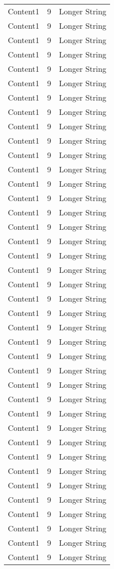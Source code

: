 \documentclass{article}%
\begin{document}
\begin{longtable}{l l l}
Content1&9&Longer String\\%
Content1&9&Longer String\\%
Content1&9&Longer String\\%
Content1&9&Longer String\\%
Content1&9&Longer String\\%
Content1&9&Longer String\\%
Content1&9&Longer String\\%
Content1&9&Longer String\\%
Content1&9&Longer String\\%
Content1&9&Longer String\\%
Content1&9&Longer String\\%
Content1&9&Longer String\\%
Content1&9&Longer String\\%
Content1&9&Longer String\\%
Content1&9&Longer String\\%
Content1&9&Longer String\\%
Content1&9&Longer String\\%
Content1&9&Longer String\\%
Content1&9&Longer String\\%
Content1&9&Longer String\\%
Content1&9&Longer String\\%
Content1&9&Longer String\\%
Content1&9&Longer String\\%
Content1&9&Longer String\\%
Content1&9&Longer String\\%
Content1&9&Longer String\\%
Content1&9&Longer String\\%
Content1&9&Longer String\\%
Content1&9&Longer String\\%
Content1&9&Longer String\\%
Content1&9&Longer String\\%
Content1&9&Longer String\\%
Content1&9&Longer String\\%
Content1&9&Longer String\\%
Content1&9&Longer String\\%
Content1&9&Longer String\\%
Content1&9&Longer String\\%
Content1&9&Longer String\\%
Content1&9&Longer String\\%
\end{longtable}%
\end{document}
